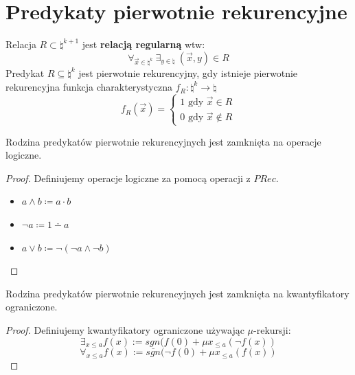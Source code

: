 \section{Predykaty pierwotnie rekurencyjne}
Relacja \(R \subset \natural^{k+1}\) jest \textbf{relacją regularną} wtw:
\[ \forall_{\vec{x} \in \natural^k} \ \exists_{y \in \natural} \ (\vec{x},y) \in R \]
Predykat \(R \subseteq \natural^k\) jest pierwotnie rekurencyjny, gdy istnieje pierwotnie rekurencyjna funkcja charakterystyczna \(f_R: \natural^k \to \natural\)
\[
f_R(\vec{x}) = 
\begin{cases}
    1 \text{ gdy } \vec{x} \in R \\
    0 \text{ gdy } \vec{x} \notin R
\end{cases}
\]
\begin{theorem}
    Rodzina predykatów pierwotnie rekurencyjnych jest zamknięta na operacje logiczne.
\end{theorem}
\begin{proof}
Definiujemy operacje logiczne za pomocą operacji z \(PRec\).
    \begin{itemize}
        \item\(a \land b \coloneq a \cdot b\) 
        \item\(\neg a \coloneq 1 \dotminus a\)
        \item\(a \lor b \coloneq \neg(\neg a \land \neg b)  \)
    \end{itemize}
\end{proof}

\begin{theorem}
    Rodzina predykatów pierwotnie rekurencyjnych jest zamknięta na kwantyfikatory ograniczone.
\end{theorem}
\begin{proof}
Definiujemy kwantyfikatory ograniczone używając \(\mu\)-rekursji:
\[\exists_{x \leq a} f(x) := sgn(f(0)+\mu x_{\leq a} (\neg f(x))\]
\[\forall_{x\leq a} f(x) := \overline{sgn} (\neg f(0)+\mu x_{\leq a} (f(x))\]
\end{proof}

